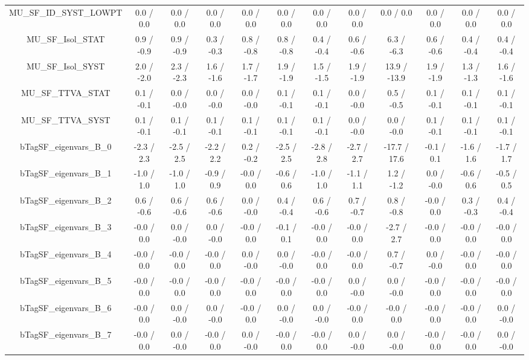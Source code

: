 \begin{table}[htbp]
\begin{center}
\begin{tabular}{|c|c|c|c|c|c|c|c|c|c|c|c|}
  MU_SF_ID_SYST_LOWPT & 0.0 / 0.0 & 0.0 / 0.0 & 0.0 / 0.0 & 0.0 / 0.0 & 0.0 / 0.0 & 0.0 / 0.0 & 0.0 / 0.0 & 0.0 / 0.0 & 0.0 / 0.0 & 0.0 / 0.0 & 0.0 / 0.0 \\ 
  MU_SF_Isol_STAT & 0.9 / -0.9 & 0.9 / -0.9 & 0.3 / -0.3 & 0.8 / -0.8 & 0.8 / -0.8 & 0.4 / -0.4 & 0.6 / -0.6 & 6.3 / -6.3 & 0.6 / -0.6 & 0.4 / -0.4 & 0.4 / -0.4 \\ 
  MU_SF_Isol_SYST & 2.0 / -2.0 & 2.3 / -2.3 & 1.6 / -1.6 & 1.7 / -1.7 & 1.9 / -1.9 & 1.5 / -1.5 & 1.9 / -1.9 & 13.9 / -13.9 & 1.9 / -1.9 & 1.3 / -1.3 & 1.6 / -1.6 \\ 
  MU_SF_TTVA_STAT & 0.1 / -0.1 & 0.0 / -0.0 & 0.0 / -0.0 & 0.0 / -0.0 & 0.1 / -0.1 & 0.1 / -0.1 & 0.0 / -0.0 & 0.5 / -0.5 & 0.1 / -0.1 & 0.1 / -0.1 & 0.1 / -0.1 \\ 
  MU_SF_TTVA_SYST & 0.1 / -0.1 & 0.1 / -0.1 & 0.1 / -0.1 & 0.1 / -0.1 & 0.1 / -0.1 & 0.1 / -0.1 & 0.0 / -0.0 & 0.0 / -0.0 & 0.1 / -0.1 & 0.1 / -0.1 & 0.1 / -0.1 \\ 
  bTagSF_eigenvars_B_0 & -2.3 / 2.3 & -2.5 / 2.5 & -2.2 / 2.2 & 0.2 / -0.2 & -2.5 / 2.5 & -2.8 / 2.8 & -2.7 / 2.7 & -17.7 / 17.6 & -0.1 / 0.1 & -1.6 / 1.6 & -1.7 / 1.7 \\ 
  bTagSF_eigenvars_B_1 & -1.0 / 1.0 & -1.0 / 1.0 & -0.9 / 0.9 & -0.0 / 0.0 & -0.6 / 0.6 & -1.0 / 1.0 & -1.1 / 1.1 & 1.2 / -1.2 & 0.0 / -0.0 & -0.6 / 0.6 & -0.5 / 0.5 \\ 
  bTagSF_eigenvars_B_2 & 0.6 / -0.6 & 0.6 / -0.6 & 0.6 / -0.6 & 0.0 / -0.0 & 0.4 / -0.4 & 0.6 / -0.6 & 0.7 / -0.7 & 0.8 / -0.8 & -0.0 / 0.0 & 0.3 / -0.3 & 0.4 / -0.4 \\ 
  bTagSF_eigenvars_B_3 & -0.0 / 0.0 & 0.0 / -0.0 & 0.0 / -0.0 & -0.0 / 0.0 & -0.1 / 0.1 & -0.0 / 0.0 & -0.0 / 0.0 & -2.7 / 2.7 & -0.0 / 0.0 & -0.0 / 0.0 & -0.0 / 0.0 \\ 
  bTagSF_eigenvars_B_4 & -0.0 / 0.0 & -0.0 / 0.0 & -0.0 / 0.0 & 0.0 / -0.0 & 0.0 / -0.0 & -0.0 / 0.0 & -0.0 / 0.0 & 0.7 / -0.7 & 0.0 / -0.0 & -0.0 / 0.0 & -0.0 / 0.0 \\ 
  bTagSF_eigenvars_B_5 & -0.0 / 0.0 & -0.0 / 0.0 & -0.0 / 0.0 & -0.0 / 0.0 & -0.0 / 0.0 & -0.0 / 0.0 & 0.0 / -0.0 & 0.0 / -0.0 & -0.0 / 0.0 & -0.0 / 0.0 & -0.0 / 0.0 \\ 
  bTagSF_eigenvars_B_6 & -0.0 / 0.0 & 0.0 / -0.0 & 0.0 / -0.0 & -0.0 / 0.0 & 0.0 / -0.0 & 0.0 / -0.0 & -0.0 / 0.0 & -0.0 / 0.0 & -0.0 / 0.0 & -0.0 / 0.0 & 0.0 / -0.0 \\ 
  bTagSF_eigenvars_B_7 & -0.0 / 0.0 & 0.0 / -0.0 & -0.0 / 0.0 & 0.0 / -0.0 & -0.0 / 0.0 & -0.0 / 0.0 & 0.0 / -0.0 & 0.0 / -0.0 & -0.0 / 0.0 & -0.0 / 0.0 & 0.0 / -0.0 \\ 

\end{tabular}
\end{center}
\end{table}
